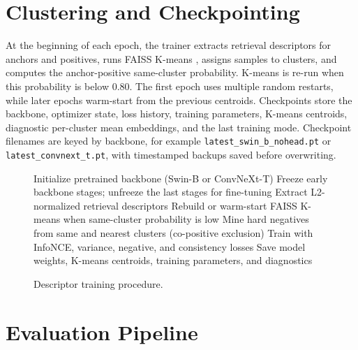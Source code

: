 \documentclass[conference]{IEEEtran}
\begin{document}
\section{Clustering and Checkpointing}
At the beginning of each epoch, the trainer extracts retrieval
descriptors for anchors and positives, runs FAISS K-means
\cite{macqueen1967methods,johnson2019billion},
assigns samples to clusters, and computes the anchor-positive same-cluster
probability. K-means is re-run when this probability is below 0.80. The first
epoch uses multiple random restarts, while later epochs warm-start from the
previous centroids. Checkpoints store the backbone,
optimizer state, loss history, training parameters, K-means
centroids, diagnostic per-cluster mean embeddings, and the last training mode.
Checkpoint filenames are keyed by backbone, for example
\texttt{latest\_swin\_b\_nohead.pt} or \texttt{latest\_convnext\_t.pt}, with
timestamped backups saved before overwriting.

\begin{figure}[htbp]
\centering
\begin{minipage}{0.95\linewidth}
\begin{algorithmic}[1]
\STATE Initialize pretrained backbone (Swin-B or ConvNeXt-T)
\STATE Freeze early backbone stages; unfreeze the last stages for fine-tuning
    \STATE Extract L2-normalized retrieval descriptors
    \STATE Rebuild or warm-start FAISS K-means when same-cluster probability is low
    \STATE Mine hard negatives from same and nearest clusters (co-positive exclusion)
    \STATE Train with InfoNCE, variance, negative, and consistency losses
\ENDFOR
\STATE Save model weights, K-means centroids, training parameters, and diagnostics
\end{algorithmic}
\end{minipage}
\caption{Descriptor training procedure.}
\label{alg:training}
\end{figure}

\section{Evaluation Pipeline}
\end{document}
